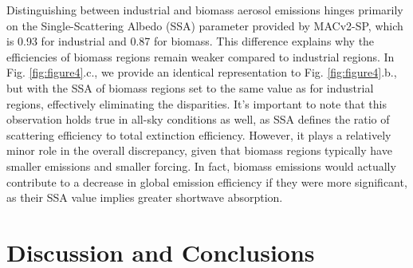 \documentclass[draft]{agujournal2019}
\begin{document}
            Distinguishing between industrial and biomass aerosol emissions hinges primarily on the Single-Scattering Albedo (SSA) parameter provided by MACv2-SP, which is 0.93 for industrial and 0.87 for biomass. This difference explains why the efficiencies of biomass regions remain weaker compared to industrial regions. In Fig. \ref{fig:figure4}.c., we provide an identical representation to Fig. \ref{fig:figure4}.b., but with the SSA of biomass regions set to the same value as for industrial regions, effectively eliminating the disparities.
            It's important to note that this observation holds true in all-sky conditions as well, as SSA defines the ratio of scattering efficiency to total extinction efficiency. However, it plays a relatively minor role in the overall discrepancy, given that biomass regions typically have smaller emissions and smaller forcing. In fact, biomass emissions would actually contribute to a decrease in global emission efficiency if they were more significant, as their SSA value implies greater shortwave absorption.

\section{Discussion and Conclusions}
      




%
%
\end{document}
